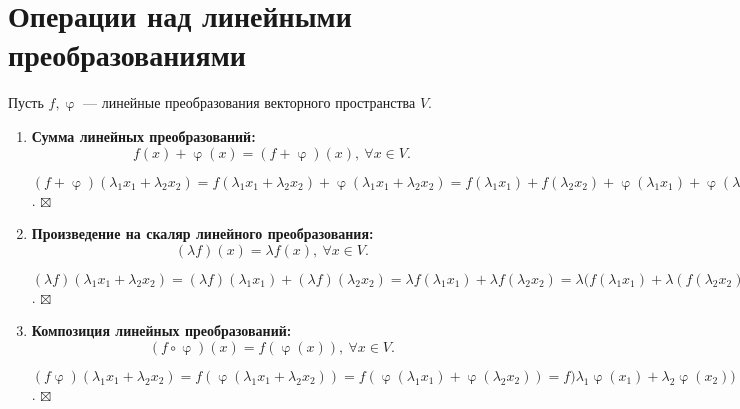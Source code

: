 \documentclass[a4paper, 12pt]{article}
\newenvironment{Proof}
{\par\noindent{$\blacklozenge$}}
{\hfill$\scriptstyle\boxtimes$}
\renewcommand{\varphi}{\upvarphi}
\begin{document}
\section{Операции над линейными преобразованиями}
Пусть $f, \varphi$ --- линейные преобразования векторного пространства $V$.
\begin{enumerate}
    \item \textbf{Сумма линейных преобразований:} $$f(x) + \varphi(x) = (f+\varphi)(x),\ \forall x \in V.$$
    \begin{Proof}
    	$(f+\varphi)(\lambda_1 x_1 + \lambda_2 x_2)=f(\lambda_1 x_1 + \lambda_2 x_2) + \varphi(\lambda_1 x_1 + \lambda_2 x_2)=f(\lambda_1 x_1) + f(\lambda_2 x_2) + \varphi(\lambda_1 x_1) + \varphi(\lambda_2 x_2) = \lambda_1f(x_1)+\lambda_2f(x_2)+\lambda_1\varphi(x_1)+\lambda_2\varphi(x_2)=\lambda_1(f(x_1)+\varphi(x_1))+\lambda_2(f(x_2)+\varphi(x_2))=\lambda_1(f+\varphi)(x_1)+\lambda_2(f+\varphi)(x_2)$.
    \end{Proof} 
    \item \textbf{Произведение на скаляр линейного преобразования:} $$(\lambda f)(x) =  \lambda f(x),\ \forall x \in V.$$
    \begin{Proof}
    	$(\lambda f)(\lambda_1 x_1 + \lambda_2 x_2)=(\lambda f)(\lambda_1 x_1)+(\lambda f)(\lambda_2 x_2)=\lambda f(\lambda_1 x_1)+\lambda f(\lambda_2 x_2)=\lambda(f(\lambda_1 x_1)+\lambda(f(\lambda_2 x_2))=\lambda f(\lambda_1x_1+\lambda_2x_2)$.
    \end{Proof} 
    \item \textbf{Композиция линейных преобразований:} $$(f\circ \varphi)(x) = f(\varphi(x)),\ \forall x \in V.$$
    \begin{Proof}
    	$(f\varphi)(\lambda_1x_1+\lambda_2x_2)=f(\varphi(\lambda_1x_1+\lambda_2x_2))=f(\varphi(\lambda_1x_1)+\varphi(\lambda_2x_2))=f)\lambda_1\varphi(x_1)+\lambda_2\varphi(x_2))=\lambda_1f(\varphi(x_1))+\lambda_2f(\varphi(x_2))=\lambda_1(f\varphi)(x_1)+\lambda_2(f\varphi)(x_2)$.
    \end{Proof} 
\end{enumerate}
\end{document}
